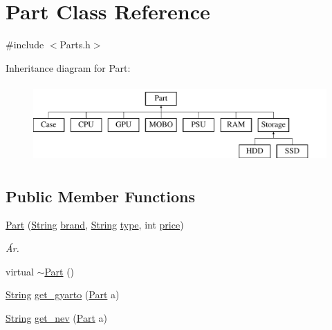 \hypertarget{class_part}{}\section{Part Class Reference}
\label{class_part}


{\ttfamily \#include $<$Parts.\+h$>$}

Inheritance diagram for Part\+:\begin{figure}[H]
\begin{center}
\leavevmode
\includegraphics[height=3.000000cm]{class_part}
\end{center}
\end{figure}
\subsection*{Public Member Functions}
\begin{DoxyCompactItemize}
\item 
\mbox{\hyperlink{class_part_af4aa597f74d7f630166103dc8b050870}{Part}} (\mbox{\hyperlink{class_string}{String}} \mbox{\hyperlink{class_part_ae06f2fdeb7fbbdb229a7aca151f3e341}{brand}}, \mbox{\hyperlink{class_string}{String}} \mbox{\hyperlink{class_part_a101dbcc5c4b21564df7414c7eb0eae88}{type}}, int \mbox{\hyperlink{class_part_a8e71223aed1da95a974f33d8d6c91bb1}{price}})
\begin{DoxyCompactList}\small\item\em Ár. \end{DoxyCompactList}\item 
virtual \mbox{\hyperlink{class_part_aaecbb747a7227f7ce3b44caeaf1801c2}{$\sim$\+Part}} ()
\item 
\mbox{\hyperlink{class_string}{String}} \mbox{\hyperlink{class_part_aa98694c9311a297dd64cb2dff660ece2}{get\+\_\+gyarto}} (\mbox{\hyperlink{class_part}{Part}} a)
\item 
\mbox{\hyperlink{class_string}{String}} \mbox{\hyperlink{class_part_a9412da55e41f491e3ae0fd7c3586f7fa}{get\+\_\+nev}} (\mbox{\hyperlink{class_part}{Part}} a)
\end{DoxyCompactItemize}

